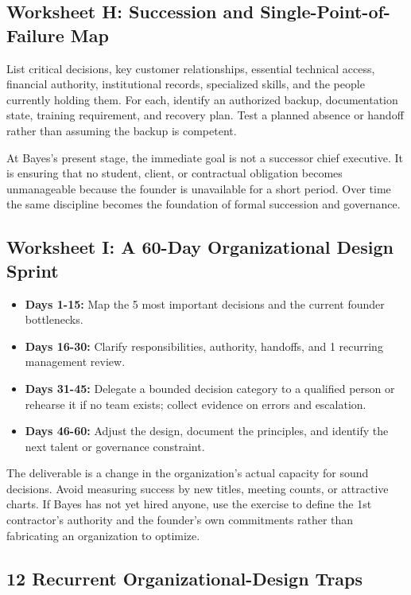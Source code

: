 \subsection{Worksheet H: Succession and Single-Point-of-Failure Map}
\label{sec:worksheet_succession_failure_map}

List critical decisions, key customer relationships, essential technical access, financial authority, institutional records, specialized skills, and the people currently holding them. For each, identify an authorized backup, documentation state, training requirement, and recovery plan. Test a planned absence or handoff rather than assuming the backup is competent.

At Bayes's present stage, the immediate goal is not a successor chief executive. It is ensuring that no student, client, or contractual obligation becomes unmanageable because the founder is unavailable for a short period. Over time the same discipline becomes the foundation of formal succession and governance.

\subsection{Worksheet I: A 60-Day Organizational Design Sprint}
\label{sec:worksheet_60day_sprint}

\begin{itemize}
    \item \textbf{Days 1-15:} Map the 5 most important decisions and the current founder bottlenecks.
    \item \textbf{Days 16-30:} Clarify responsibilities, authority, handoffs, and 1 recurring management review.
    \item \textbf{Days 31-45:} Delegate a bounded decision category to a qualified person or rehearse it if no team exists; collect evidence on errors and escalation.
    \item \textbf{Days 46-60:} Adjust the design, document the principles, and identify the next talent or governance constraint.
\end{itemize}

The deliverable is a change in the organization's actual capacity for sound decisions. Avoid measuring success by new titles, meeting counts, or attractive charts. If Bayes has not yet hired anyone, use the exercise to define the 1st contractor's authority and the founder's own commitments rather than fabricating an organization to optimize.

\subsection{12 Recurrent Organizational-Design Traps}
\label{sec:twelve_design_traps}

